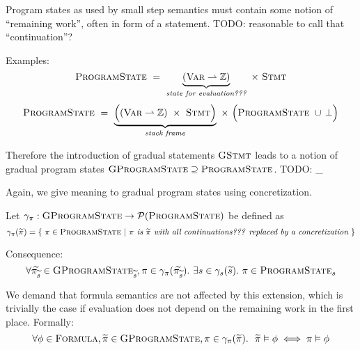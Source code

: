 Program states as used by small step semantics must contain some notion of “remaining work”, often in form of a statement.
TODO: reasonable to call that “continuation”?

Examples:
\begin{displaymath}
\textsc{ProgramState} ~=~ \underbrace{(\textsc{Var} \rightharpoonup \mathbb{Z})}_{\textit{state for evaluation???}} ~\times~ \textsc{Stmt}
\end{displaymath}
\begin{displaymath}
\textsc{ProgramState} ~=~ \underbrace{\Big((\textsc{Var} \rightharpoonup \mathbb{Z}) ~\times~ \textsc{Stmt} \Big)}_{\textit{stack frame}} ~\times~ \Big(\textsc{ProgramState} ~\cup\, \bot\Big)
\end{displaymath}

Therefore the introduction of gradual statements $\textsc{GStmt}$ leads to a notion of gradual program states $\textsc{GProgramState} \supseteq \textsc{ProgramState}$.
TODO: \setGProgramState_{}

Again, we give meaning to gradual program states using concretization.
\begin{definition}
    Let $\gamma_{\pi} : \textsc{GProgramState} \rightarrow \mathcal{P}(\textsc{ProgramState})$ be defined as
    \begin{displaymath}
    \gamma_{\pi}(\widetilde{\pi}) = \{~ \pi \in \textsc{ProgramState} ~|~ \textit{$\pi$ is $\widetilde{\pi}$ with all continuations??? replaced by a concretization} ~\}
    \end{displaymath}
\end{definition}

Consequence:
\begin{displaymath}
\forall \widetilde{\pi_{\widetilde{s}}} \in \textsc{GProgramState}_{\widetilde{s}}, \pi \in \gamma_{\pi}(\widetilde{\pi_{\widetilde{s}}}).~ \exists s \in \gamma_s(\widetilde{s}).~ \pi \in \textsc{ProgramState}_s
\end{displaymath}

We demand that formula semantics are not affected by this extension, which is trivially the case if evaluation does not depend on the remaining work in the first place.
Formally: $$\forall \phi \in \textsc{Formula}, \widetilde{\pi} \in \textsc{GProgramState}, \pi \in \gamma_{\pi}(\widetilde{\pi}).~~ \widetilde{\pi} \vDash \phi \iff \pi \vDash \phi$$
